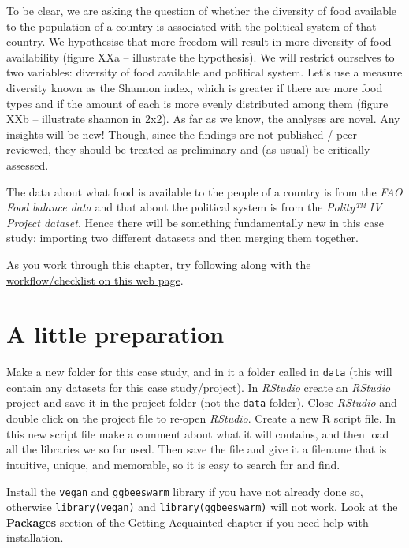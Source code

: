 \documentclass[]{book}
\begin{document}
To be clear, we are asking the question of whether the diversity of food available to the population of a country is associated with the political system of that country. We hypothesise that more freedom will result in more diversity of food availability (figure XXa -- illustrate the hypothesis). We will restrict ourselves to two variables: diversity of food available and political system. Let's use a measure diversity known as the Shannon index, which is greater if there are more food types and if the amount of each is more evenly distributed among them (figure XXb -- illustrate shannon in 2x2). As far as we know, the analyses are novel. Any insights will be new! Though, since the findings are not published / peer reviewed, they should be treated as preliminary and (as usual) be critically assessed.

The data about what food is available to the people of a country is from the \emph{FAO Food balance data} and that about the political system is from the \emph{Polity™ IV Project dataset}. Hence there will be something fundamentally new in this case study: importing two different datasets and then merging them together.

As you work through this chapter, try following along with the \href{http://r4all.org/posts/workflow-checklist-for-data-analysis/}{workflow/checklist on this web page}.

\hypertarget{a-little-preparation}{%
\section{A little preparation}\label{a-little-preparation}}

Make a new folder for this case study, and in it a folder called in \texttt{data} (this will contain any datasets for this case study/project). In \emph{RStudio} create an \emph{RStudio} project and save it in the project folder (not the \texttt{data} folder). Close \emph{RStudio} and double click on the project file to re-open \emph{RStudio}. Create a new R script file. In this new script file make a comment about what it will contains, and then load all the libraries we so far used. Then save the file and give it a filename that is intuitive, unique, and memorable, so it is easy to search for and find.

\begin{action}
Install the \texttt{vegan} and \texttt{ggbeeswarm} library if you have
not already done so, otherwise \texttt{library(vegan)} and
\texttt{library(ggbeeswarm)} will not work. Look at the
\textbf{Packages} section of the Getting Acquainted chapter if you need
help with installation.
\end{action}
\end{document}
